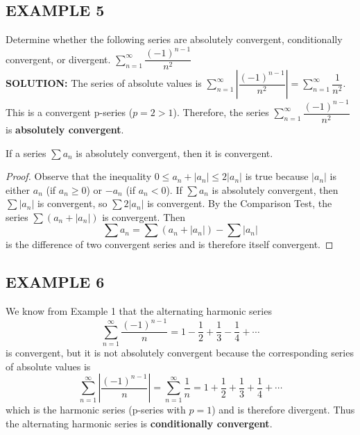 \documentclass{article}
\theoremstyle{mystyle}
\begin{document}
\subsection*{EXAMPLE 5}
Determine whether the following series are absolutely convergent, conditionally convergent, or divergent.
\( \sum_{n=1}^{\infty} \dfrac{(-1)^{n-1}}{n^2} \) \quad \\
\textbf{SOLUTION:}
The series of absolute values is \( \sum_{n=1}^{\infty} \left| \dfrac{(-1)^{n-1}}{n^2} \right| = \sum_{n=1}^{\infty} \dfrac{1}{n^2} \). This is a convergent p-series (\(p=2 > 1\)). Therefore, the series \( \sum_{n=1}^{\infty} \dfrac{(-1)^{n-1}}{n^2} \) is \textbf{absolutely convergent}.
  
\begin{tcolorbox}[
    colback=white,
    colframe=orange!80!white,
    title=Theorem,
    boxrule=0.5mm,
    arc=3mm
    ]
    If a series \( \sum a_n \) is absolutely convergent, then it is convergent.
\end{tcolorbox}

\begin{proof}
[Proof]
Observe that the inequality \( 0 \le a_n + |a_n| \le 2|a_n| \) is true because \(|a_n|\) is either \(a_n\) (if \(a_n \ge 0\)) or \(-a_n\) (if \(a_n < 0\)).
If \( \sum a_n \) is absolutely convergent, then \( \sum |a_n| \) is convergent, so \( \sum 2|a_n| \) is convergent. By the Comparison Test, the series \( \sum (a_n + |a_n|) \) is convergent. Then
\[ \sum a_n = \sum (a_n + |a_n|) - \sum |a_n| \]
is the difference of two convergent series and is therefore itself convergent.
\end{proof}

\subsection*{EXAMPLE 6}
We know from Example 1 that the alternating harmonic series
\[ \sum_{n=1}^{\infty} \dfrac{(-1)^{n-1}}{n} = 1 - \dfrac{1}{2} + \dfrac{1}{3} - \dfrac{1}{4} + \cdots \]
is convergent, but it is not absolutely convergent because the corresponding series of absolute values is
\[ \sum_{n=1}^{\infty} \left| \dfrac{(-1)^{n-1}}{n} \right| = \sum_{n=1}^{\infty} \dfrac{1}{n} = 1 + \dfrac{1}{2} + \dfrac{1}{3} + \dfrac{1}{4} + \cdots \]
which is the harmonic series (p-series with \(p=1\)) and is therefore divergent. Thus the alternating harmonic series is \textbf{conditionally convergent}.
\end{document}
